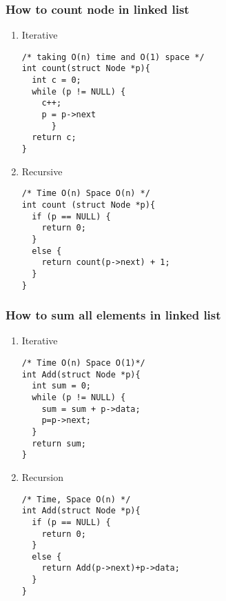 \documentclass[11pt]{article}
\begin{document}
\subsubsection{How to count node in linked list}
\label{sec:orga1bb46f}
\begin{enumerate}
\item Iterative
\label{sec:org22c11e3}
\begin{verbatim}
/* taking O(n) time and O(1) space */
int count(struct Node *p){
  int c = 0;
  while (p != NULL) {
    c++;
    p = p->next
      }
  return c;
}
\end{verbatim}
\item Recursive
\label{sec:orgb5d6338}
\begin{verbatim}
/* Time O(n) Space O(n) */
int count (struct Node *p){
  if (p == NULL) {
    return 0;
  }
  else {
    return count(p->next) + 1;
  }
}
\end{verbatim}
\end{enumerate}
\subsubsection{How to sum all elements in linked list}
\label{sec:org5ac90c8}
\begin{enumerate}
\item Iterative
\label{sec:orgca801e5}
\begin{verbatim}
/* Time O(n) Space O(1)*/
int Add(struct Node *p){
  int sum = 0;
  while (p != NULL) {
    sum = sum + p->data;
    p=p->next;
  }
  return sum;
}
\end{verbatim}
\item Recursion
\label{sec:org56329fe}
\begin{verbatim}
/* Time, Space O(n) */
int Add(struct Node *p){
  if (p == NULL) {
    return 0;
  }
  else {
    return Add(p->next)+p->data;
  }
}
\end{verbatim}
\end{enumerate}
\end{document}
